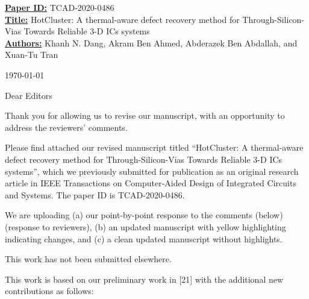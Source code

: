 \documentclass[12pt]{article}
\newcounter{reviewer}
\newcounter{point}[reviewer]
\begin{document}
\begin{sf}
{\small 
\noindent
\textbf{\underline{Paper ID:}} TCAD-2020-0486 \\
\textbf{\underline{Title:}} HotCluster: A thermal-aware defect recovery method for Through-Silicon-Vias Towards Reliable 3-D ICs systems\\
\textbf{\underline{Authors:}} Khanh N. Dang, Akram Ben Ahmed, Abderazek Ben Abdallah, and Xuan-Tu Tran \\
\vspace{0.5cm}}
\begin{flushright}
	\today
\end{flushright}

\noindent
Dear Editors 

\vspace{.5cm}
\noindent
Thank you for allowing us to revise our manuscript, with an opportunity to address the reviewers’ 
comments. 
\vspace{.5cm}

\noindent
Please find attached our revised manuscript titled ``HotCluster: A thermal-aware defect recovery method for Through-Silicon-Vias Towards Reliable 3-D ICs systems'', which we previously submitted for publication as an original research article in IEEE Transactions on Computer-Aided Design of Integrated Circuits and Systems. The paper ID is TCAD-2020-0486.
\vspace{.5cm}

\noindent
We are uploading (a) our point-by-point response to the comments (below) (response to 
reviewers), (b) an updated manuscript with yellow highlighting indicating changes, and (c) a clean 
updated manuscript without highlights.
\vspace{.5cm}

\noindent
This work has not been submitted elsewhere. 

\vspace{.3cm}
\noindent
This work is based on our preliminary work in [21] with the additional new contributions as follows:


\begin{itemize}
	

\end{itemize}
\end{sf}
\end{document}
